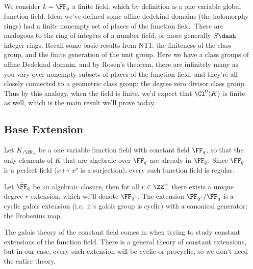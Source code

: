 \hypertarget{section}{%
\subsection{}\label{section}}

We consider \(k= \FF_q\) a finite field, which by definition is a one
variable global function field. Idea: we've defined some affine dedekind
domains (the holomorphy rings) had a finite nonempty set of places of
the function field. These are analogous to the ring of integers of a
number field, or more generally \(S\dash\)integer rings. Recall some
basic results from NT1: the finiteness of the class group, and the
finite generation of the unit group. Here we have a class groups of
affine Dedekind domain, and by Rosen's theorem, there are infinitely
many as you vary over nonempty subsets of places of the function field,
and they're all closely connected to a geometric class group: the degree
zero divisor class group. Thus by this analogy, when the field is
finite, we'd expect that \(\Cl^0(K)\) is finite as well, which is the
main result we'll prove today.

\hypertarget{base-extension-1}{%
\subsection{Base Extension}\label{base-extension-1}}

Let \(K_{/\FF_q}\) be a one variable function field with constant field
\(\FF_q\), so that the only elements of \(K\) that are algebraic over
\(\FF_q\) are already in \(\FF_q\). Since \(\FF_q\) is a perfect field
(\(x\mapsto x^p\) is a surjection), every such function field is
regular.

Let \(\bar{\FF}_q\) be an algebraic closure, then for all \(r\in \ZZ^+\)
there exists a unique degree \(r\) extension, which we'll denote
\(\FF_{q^r}\). The extension \(\FF_{q^r}/\FF_q\) is a cyclic galois
extension (i.e.~it's galois group is cyclic) with a canonical generator:
the Frobenius map.

The galois theory of the constant field comes in when trying to study
constant extensions of the function field. There is a general theory of
constant extensions, but in our case, every such extension will be
cyclic or procyclic, so we don't need the entire theory.


